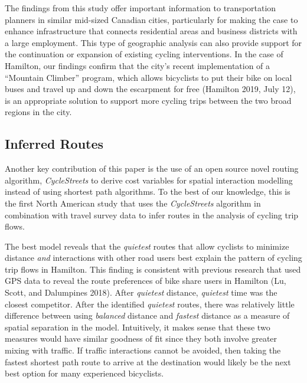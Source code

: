 \documentclass[smallextended]{svjour3}       %
\begin{document}
The findings from this study offer important information to
transportation planners in similar mid-sized Canadian cities,
particularly for making the case to enhance infrastructure that connects
residential areas and business districts with a large employment. This
type of geographic analysis can also provide support for the
continuation or expansion of existing cycling interventions. In the case
of Hamilton, our findings confirm that the city's recent implementation
of a ``Mountain Climber'' program, which allows bicyclists to put their
bike on local buses and travel up and down the escarpment for free
(Hamilton 2019, July 12), is an appropriate solution to support more
cycling trips between the two broad regions in the city.

\hypertarget{inferred-routes}{%
\subsection{Inferred Routes}\label{inferred-routes}}

Another key contribution of this paper is the use of an open source
novel routing algorithm, \emph{CycleStreets} to derive cost variables
for spatial interaction modelling instead of using shortest path
algorithms. To the best of our knowledge, this is the first North
American study that uses the \emph{CycleStreets} algorithm in
combination with travel survey data to infer routes in the analysis of
cycling trip flows.

The best model reveals that the \emph{quietest} routes that allow
cyclists to minimize distance \emph{and} interactions with other road
users best explain the pattern of cycling trip flows in Hamilton. This
finding is consistent with previous research that used GPS data to
reveal the route preferences of bike share users in Hamilton (Lu, Scott,
and Dalumpines 2018). After \emph{quietest} distance, \emph{quietest}
time was the closest competitor. After the identified \emph{quietest}
routes, there was relatively little difference between using
\emph{balanced} distance and \emph{fastest} distance as a measure of
spatial separation in the model. Intuitively, it makes sense that these
two measures would have similar goodness of fit since they both involve
greater mixing with traffic. If traffic interactions cannot be avoided,
then taking the fastest shortest path route to arrive at the destination
would likely be the next best option for many experienced bicyclists.
\end{document}
